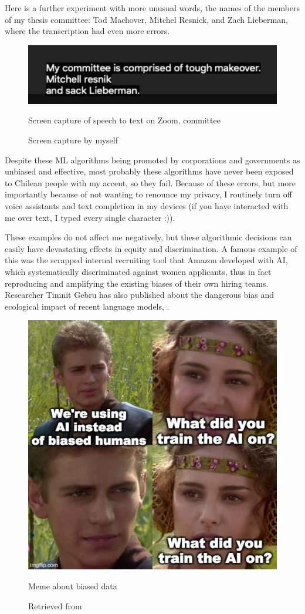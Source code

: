 Here is a further experiment with more unusual words, the names of the members of my thesis committee: Tod Machover, Mitchel Resnick, and Zach Lieberman, where the transcription had even more errors.

\begin{figure}[ht]
  \centering
  \includegraphics[width=0.75\linewidth,height=0.25\textheight,keepaspectratio]{images/zoom-committee.jpg}
  \caption{Screen capture of speech to text on Zoom, committee}
  \caption*{Screen capture by myself}
  \label{fig:zoom-committee}
\end{figure}

Despite these \acrshort{ML} algorithms being promoted by corporations and governments as unbiased and effective, most probably these algorithms have never been exposed to Chilean people with my accent, so they fail. Because of these errors, but more importantly because of not wanting to renounce my privacy, I routinely turn off voice assistants and text completion in my devices (if you have interacted with me over text, I typed every single character :)).

These examples do not affect me negatively, but these algorithmic decisions can easily have devastating effects in equity and discrimination. A famous example of this was the scrapped internal recruiting tool that Amazon developed with \acrshort{AI}, which systematically discriminated against women applicants, thus in fact reproducing and amplifying the existing biases of their own hiring teams\cite{website-reuters-news-amazon-ai-bias}. Researcher Timnit Gebru has also published about the dangerous bias and ecological impact of recent language models, \cite{wired-timnit-gebru-google}.

\begin{figure}[ht]
  \centering
  \includegraphics[width=0.75\linewidth,height=0.40\textheight,keepaspectratio]{images/meme-star-wars.jpg}
  \caption{Meme about biased data}
  \caption*{Retrieved from \cite{website-twitter-janellecshane-meme}}
  \label{fig:meme-star-wars}
\end{figure}


